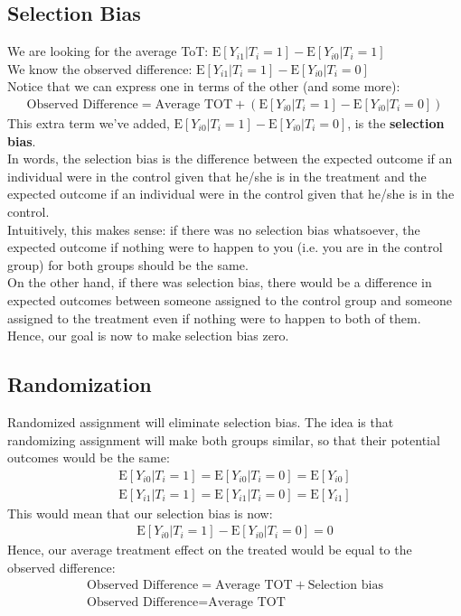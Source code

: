 \documentclass{article}
\begin{document}
\subsection{Selection Bias}
We are looking for the average ToT: $\text{E}[Y_{i1} | T_i = 1] - \text{E}[Y_{i0} | T_i = 1]$\\
We know the observed difference: $\text{E}[Y_{i1}|T_i = 1] - \text{E}[Y_{i0}|T_i = 0]$
\\
Notice that we can express one in terms of the other (and some more):
\begin{gather*}
    \text{Observed Difference} = \text{Average TOT} + (\text{E}[Y_{i0} | T_i = 1] - \text{E}[Y_{i0}|T_i = 0])
\end{gather*}
This extra term we've added, $\text{E}[Y_{i0} | T_i = 1] - \text{E}[Y_{i0}|T_i = 0]$, is the \textbf{selection bias}.
\\
In words, the selection bias is the difference between the expected outcome if an individual were in the control given that he/she is in the treatment and the expected outcome if an individual were in the control given that he/she is in the control.
\\
Intuitively, this makes sense: if there was no selection bias whatsoever, the expected outcome if nothing were to happen to you (i.e. you are in the control group) for both groups should be the same.
\\
On the other hand, if there was selection bias, there would be a difference in expected outcomes between someone assigned to the control group and someone assigned to the treatment even if nothing were to happen to both of them.
\\
Hence, our goal is now to make selection bias zero.

\subsection{Randomization}
Randomized assignment will eliminate selection bias.
The idea is that randomizing assignment will make both groups similar, so that their potential outcomes would be the same:
\begin{gather*}
    \text{E}[Y_{i0}|T_i = 1] = \text{E}[Y_{i0}|T_i = 0] = \text{E}[Y_{i0}]\\
    \text{E}[Y_{i1}|T_i = 1] = \text{E}[Y_{i1}|T_i = 0] = \text{E}[Y_{i1}]
\end{gather*}
This would mean that our selection bias is now:
\begin{gather*}
    \text{E}[Y_{i0} | T_i = 1] - \text{E}[Y_{i0}|T_i = 0] = 0
\end{gather*}
Hence, our average treatment effect on the treated would be equal to the observed difference:
\begin{gather*}
    \text{Observed Difference} = \text{Average TOT} + \text{Selection bias}\\
    \text{Observed Difference} = \text{Average TOT}
\end{gather*}
\end{document}
